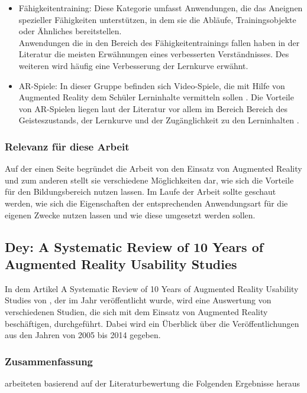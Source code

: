 \begin{itemize}
\item Fähigkeitentraining: Diese Kategorie umfasst Anwendungen, die das Aneignen spezieller Fähigkeiten unterstützen, in dem sie die Abläufe, Trainingsobjekte oder Ähnliches bereitstellen. \citep[Kapitel 2.2]{diegmann:benefits-ar} \\
Anwendungen die in den Bereich des Fähigkeitentrainings fallen haben in der Literatur die meisten Erwähnungen eines verbesserten Verständnisses. Des weiteren wird häufig eine Verbesserung der Lernkurve erwähnt. \citep[Kapitel 5]{diegmann:benefits-ar}
\item AR-Spiele: In dieser Gruppe befinden sich Video-Spiele, die mit Hilfe von Augmented Reality dem Schüler Lerninhalte vermitteln sollen \citep[Kapitel 2.2]{diegmann:benefits-ar}.
Die Vorteile von AR-Spielen liegen laut der Literatur vor allem im Bereich Bereich des Geisteszustands, der Lernkurve und der Zugänglichkeit zu den Lerninhalten \citep[Kapitel 5]{diegmann:benefits-ar}.
\end{itemize}

\subsubsection{Relevanz für diese Arbeit}
Auf der einen Seite begründet die Arbeit von \citeauthor{diegmann:benefits-ar} den Einsatz von Augmented Reality und zum anderen stellt sie verschiedene Möglichkeiten dar, wie sich die Vorteile für den Bildungsbereich nutzen lassen. Im Laufe der Arbeit sollte geschaut werden, wie sich die Eigenschaften der entsprechenden Anwendungsart für die eigenen Zwecke nutzen lassen und wie diese umgesetzt werden sollen.


\subsection{Dey: A Systematic Review of 10 Years of Augmented Reality Usability Studies}
In dem Artikel \glqq  A Systematic Review of 10 Years of Augmented Reality Usability Studies\grqq{} von \citeauthor{dey:review-of-ar-studies}, der im Jahr \citeyear{dey:review-of-ar-studies} veröffentlicht wurde, wird eine Auswertung von verschiedenen Studien, die sich mit dem Einsatz von Augmented Reality beschäftigen, durchgeführt. Dabei wird ein Überblick über die Veröffentlichungen aus den Jahren von 2005 bis 2014 gegeben.\\

\subsubsection{Zusammenfassung}
\citeauthor{dey:review-of-ar-studies} arbeiteten basierend auf der Literaturbewertung die Folgenden Ergebnisse heraus

